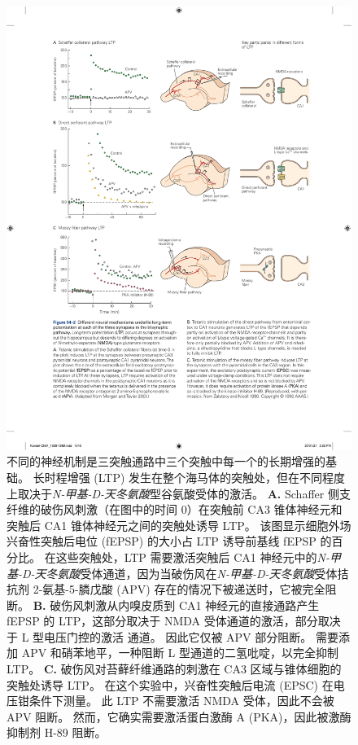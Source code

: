 \begin{figure}[htbp]
	\centering
	\includegraphics[width=0.9\linewidth]{chap54/fig_54_2}
	\caption{不同的神经机制是三突触通路中三个突触中每一个的长期增强的基础。
		长时程增强 (LTP) 发生在整个海马体的突触处，但在不同程度上取决于\textit{N-甲基-D-天冬氨酸}型谷氨酸受体的激活。
		\textbf{A.} Schaffer 侧支纤维的破伤风刺激（在图中的时间 0）在突触前 CA3 锥体神经元和突触后 CA1 锥体神经元之间的突触处诱导 LTP。
		该图显示细胞外场兴奋性突触后电位 (fEPSP) 的大小占 LTP 诱导前基线 fEPSP 的百分比。
		在这些突触处，LTP 需要激活突触后 CA1 神经元中的\textit{N-甲基-D-天冬氨酸}受体通道，因为当破伤风在\textit{N-甲基-D-天冬氨酸}受体拮抗剂 2-氨基-5-膦戊酸 (APV) 存在的情况下被递送时，它被完全阻断\cite{morgan2001electrical}。
		\textbf{B.} 破伤风刺激从内嗅皮质到 CA1 神经元的直接通路产生 fEPSP 的 LTP，这部分取决于 NMDA 受体通道的激活，部分取决于 L 型电压门控的激活  通道。 因此它仅被 APV 部分阻断。 需要添加 APV 和硝苯地平，一种阻断 L 型通道的二氢吡啶，以完全抑制 LTP。
		\textbf{C.} 破伤风对苔藓纤维通路的刺激在 CA3 区域与锥体细胞的突触处诱导 LTP。
		在这个实验中，兴奋性突触后电流 (EPSC) 在电压钳条件下测量。
		此 LTP 不需要激活 NMDA 受体，因此不会被 APV 阻断。
		然而，它确实需要激活蛋白激酶 A (PKA)，因此被激酶抑制剂 H-89 阻断\cite{zalutsky1990comparison}。}
	\label{fig:54_2}
\end{figure}


